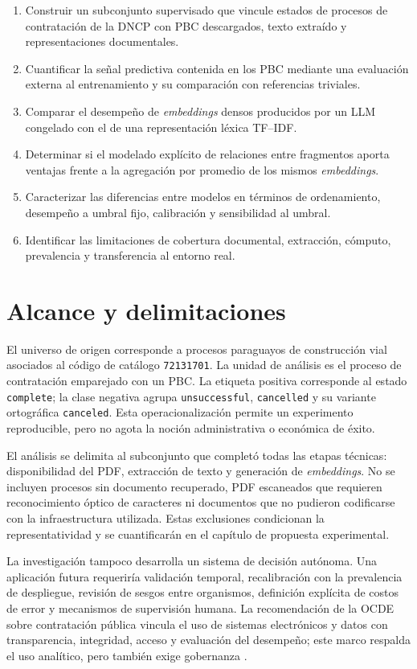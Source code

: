 \begin{enumerate}
  \item Construir un subconjunto supervisado que vincule estados de procesos de contratación de la DNCP con PBC descargados, texto extraído y representaciones documentales.
  \item Cuantificar la señal predictiva contenida en los PBC mediante una evaluación externa al entrenamiento y su comparación con referencias triviales.
  \item Comparar el desempeño de \textit{embeddings} densos producidos por un LLM congelado con el de una representación léxica TF--IDF.
  \item Determinar si el modelado explícito de relaciones entre fragmentos aporta ventajas frente a la agregación por promedio de los mismos \textit{embeddings}.
  \item Caracterizar las diferencias entre modelos en términos de ordenamiento, desempeño a umbral fijo, calibración y sensibilidad al umbral.
  \item Identificar las limitaciones de cobertura documental, extracción, cómputo, prevalencia y transferencia al entorno real.
\end{enumerate}

\section{Alcance y delimitaciones}

El universo de origen corresponde a procesos paraguayos de construcción vial asociados al código de catálogo \texttt{72131701}. La unidad de análisis es el proceso de contratación emparejado con un PBC. La etiqueta positiva corresponde al estado \texttt{complete}; la clase negativa agrupa \texttt{unsuccessful}, \texttt{cancelled} y su variante ortográfica \texttt{canceled}. Esta operacionalización permite un experimento reproducible, pero no agota la noción administrativa o económica de éxito.

El análisis se delimita al subconjunto que completó todas las etapas técnicas: disponibilidad del PDF, extracción de texto y generación de \textit{embeddings}. No se incluyen procesos sin documento recuperado, PDF escaneados que requieren reconocimiento óptico de caracteres ni documentos que no pudieron codificarse con la infraestructura utilizada. Estas exclusiones condicionan la representatividad y se cuantificarán en el capítulo de propuesta experimental.

La investigación tampoco desarrolla un sistema de decisión autónoma. Una aplicación futura requeriría validación temporal, recalibración con la prevalencia de despliegue, revisión de sesgos entre organismos, definición explícita de costos de error y mecanismos de supervisión humana. La recomendación de la OCDE sobre contratación pública vincula el uso de sistemas electrónicos y datos con transparencia, integridad, acceso y evaluación del desempeño; este marco respalda el uso analítico, pero también exige gobernanza \parencite{oecd2015procurement}.

